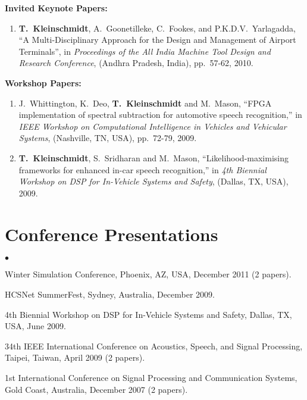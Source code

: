 \documentclass[margin,line]{resume}
\newenvironment{list2}{
  \begin{list}{$\bullet$}{%
      \setlength{\itemsep}{0in}
      \setlength{\parsep}{0in} \setlength{\parskip}{0in}
      \setlength{\topsep}{0in} \setlength{\partopsep}{0in}
      \setlength{\leftmargin}{0.2in}}}{\end{list}}
\begin{document}
\begin{resume}
\newpage
{\bf Invited Keynote Papers:}
\begin{enumerate}
\item {\bf T.~Kleinschmidt}, A.~Goonetilleke, C.~Fookes, and P.K.D.V.~Yarlagadda, ``A Multi-Disciplinary Approach for the Design and Management of Airport Terminals'', in \emph{Proceedings of the All India Machine Tool Design and Research Conference}, (Andhra Pradesh, India), pp.~57-62, 2010.
\end{enumerate}

{\bf Workshop Papers:}
%
\begin{enumerate}
    \setlength{\itemsep}{2pt}
    \setlength{\parsep}{0pt}
    \setlength{\parskip}{0pt}

\item J.~Whittington, K.~Deo, {\bf T.~Kleinschmidt} and
    M.~Mason, ``FPGA implementation of spectral subtraction
    for automotive speech recognition,'' in {\em IEEE Workshop
    on Computational Intelligence in Vehicles and Vehicular
    Systems}, (Nashville, TN, USA), pp.~72-79, 2009.

\item {\bf T.~Kleinschmidt}, S.~Sridharan and M.~Mason,
    ``Likelihood-maximising frameworks for enhanced in-car
    speech recognition,'' in \emph{4th Biennial Workshop on
    DSP for In-Vehicle Systems and Safety}, (Dallas, TX, USA),
    2009.

\end{enumerate}

\vspace{4ex}
\section{\sc Conference Presentations}
\begin{list2}
\item Winter Simulation Conference, Phoenix, AZ, USA, December 2011 (2 papers).
\item HCSNet SummerFest, Sydney, Australia, December 2009.
\item 4th Biennial Workshop on DSP for In-Vehicle Systems
    and Safety, Dallas, TX, USA, June 2009.
\item 34th IEEE International Conference on Acoustics, Speech, and
    Signal Processing, Taipei, Taiwan, April 2009 (2 papers).
\item 1st International Conference on Signal Processing and
    Communication Systems, Gold Coast, Australia, December 2007 (2 papers).
\end{list2}
%


\end{resume}
\end{document}

